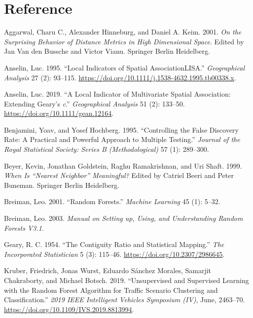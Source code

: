 \documentclass[
  a4paper,
  12pt]{article}
\newlength{\cslhangindent}
\newenvironment{CSLReferences}[2] %
 {\begin{list}{}{%
  \setlength{\itemindent}{0pt}
  \setlength{\leftmargin}{0pt}
  \setlength{\parsep}{0pt}
  \ifodd #1
   \setlength{\leftmargin}{\cslhangindent}
   \setlength{\itemindent}{-1\cslhangindent}
  \fi
  \setlength{\itemsep}{#2\baselineskip}}}
 {\end{list}}
\begin{document}
\section*{Reference}\label{refs}

\label{refs}
\begin{CSLReferences}{1}{1}
Aggarwal, Charu C., Alexander Hinneburg, and Daniel A. Keim. 2001.
\emph{On the Surprising Behavior of Distance Metrics in High Dimensional
Space}. Edited by Jan Van den Bussche and Victor Vianu. Springer Berlin
Heidelberg.

Anselin, Luc. 1995. {``Local Indicators of Spatial
Association{\textemdash}LISA.''} \emph{Geographical Analysis} 27 (2):
93--115. \url{https://doi.org/10.1111/j.1538-4632.1995.tb00338.x}.

Anselin, Luc. 2019. {``A Local Indicator of Multivariate Spatial
Association: Extending Geary's {\emph{c}}.''} \emph{Geographical
Analysis} 51 (2): 133--50. \url{https://doi.org/10.1111/gean.12164}.

Benjamini, Yoav, and Yosef Hochberg. 1995. {``Controlling the False
Discovery Rate: A Practical and Powerful Approach to Multiple
Testing.''} \emph{Journal of the Royal Statistical Society: Series B
(Methodological)} 57 (1): 289--300.

Beyer, Kevin, Jonathan Goldstein, Raghu Ramakrishnan, and Uri Shaft.
1999. \emph{When Is {``}Nearest Neighbor{''} Meaningful?} Edited by
Catriel Beeri and Peter Buneman. Springer Berlin Heidelberg.

Breiman, Leo. 2001. {``Random Forests.''} \emph{Machine Learning} 45
(1): 5--32.

Breiman, Leo. 2003. \emph{Manual on Setting up, Using, and Understanding
Random Forests V3.1}.

Geary, R. C. 1954. {``The Contiguity Ratio and Statistical Mapping.''}
\emph{The Incorporated Statistician} 5 (3): 115--46.
\url{https://doi.org/10.2307/2986645}.

Kruber, Friedrich, Jonas Wurst, Eduardo Sánchez Morales, Samarjit
Chakraborty, and Michael Botsch. 2019. {``Unsupervised and Supervised
Learning with the Random Forest Algorithm for Traffic Scenario
Clustering and Classification.''} \emph{2019 IEEE Intelligent Vehicles
Symposium (IV)}, June, 2463--70.
\url{https://doi.org/10.1109/IVS.2019.8813994}.


\end{CSLReferences}
\end{document}
